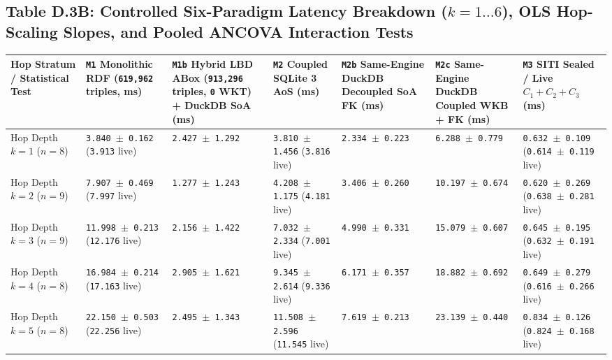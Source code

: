 \documentclass[10pt,a4paper]{article}
\begin{document}
\subsection*{Table D.3B: Controlled Six-Paradigm Latency Breakdown ($k = 1 \dots 6$), OLS Hop-Scaling Slopes, and Pooled ANCOVA Interaction Tests}

{\scriptsize
\begin{longtable}{p{}p{}p{}p{}p{}p{}p{}}
\toprule
\textbf{Hop Stratum / Statistical Test} & \textbf{\texttt{M1} Monolithic RDF (\texttt{619,962} triples, ms)} & \textbf{\texttt{M1b} Hybrid LBD ABox (\texttt{913,296} triples, \texttt{0} WKT) + DuckDB SoA (ms)} & \textbf{\texttt{M2} Coupled SQLite 3 AoS (ms)} & \textbf{\texttt{M2b} Same-Engine DuckDB Decoupled SoA FK (ms)} & \textbf{\texttt{M2c} Same-Engine DuckDB Coupled WKB + FK (ms)} & \textbf{\texttt{M3} SITI Sealed / Live $C_1+C_2+C_3$ (ms)} \\
\midrule
\endhead
Hop Depth $k = 1$ ($n = 8$) & \texttt{3.840 $\pm$ 0.162} (\texttt{3.913} live) & \texttt{2.427 $\pm$ 1.292} & \texttt{3.810 $\pm$ 1.456} (\texttt{3.816} live) & \texttt{2.334 $\pm$ 0.223} & \texttt{6.288 $\pm$ 0.779} & \texttt{0.632 $\pm$ 0.109} (\texttt{0.614 $\pm$ 0.119} live) \\
Hop Depth $k = 2$ ($n = 9$) & \texttt{7.907 $\pm$ 0.469} (\texttt{7.997} live) & \texttt{1.277 $\pm$ 1.243} & \texttt{4.208 $\pm$ 1.175} (\texttt{4.181} live) & \texttt{3.406 $\pm$ 0.260} & \texttt{10.197 $\pm$ 0.674} & \texttt{0.620 $\pm$ 0.269} (\texttt{0.638 $\pm$ 0.281} live) \\
Hop Depth $k = 3$ ($n = 9$) & \texttt{11.998 $\pm$ 0.213} (\texttt{12.176} live) & \texttt{2.156 $\pm$ 1.422} & \texttt{7.032 $\pm$ 2.334} (\texttt{7.001} live) & \texttt{4.990 $\pm$ 0.331} & \texttt{15.079 $\pm$ 0.607} & \texttt{0.645 $\pm$ 0.195} (\texttt{0.632 $\pm$ 0.191} live) \\
Hop Depth $k = 4$ ($n = 8$) & \texttt{16.984 $\pm$ 0.214} (\texttt{17.163} live) & \texttt{2.905 $\pm$ 1.621} & \texttt{9.345 $\pm$ 2.614} (\texttt{9.336} live) & \texttt{6.171 $\pm$ 0.357} & \texttt{18.882 $\pm$ 0.692} & \texttt{0.649 $\pm$ 0.279} (\texttt{0.616 $\pm$ 0.266} live) \\
Hop Depth $k = 5$ ($n = 8$) & \texttt{22.150 $\pm$ 0.503} (\texttt{22.256} live) & \texttt{2.495 $\pm$ 1.343} & \texttt{11.508 $\pm$ 2.596} (\texttt{11.545} live) & \texttt{7.619 $\pm$ 0.213} & \texttt{23.139 $\pm$ 0.440} & \texttt{0.834 $\pm$ 0.126} (\texttt{0.824 $\pm$ 0.168} live) \\

\end{longtable}}
\end{document}
